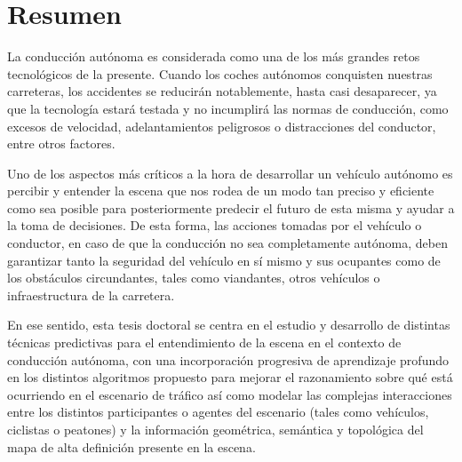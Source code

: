%
%
%
% 
%
%
%
%

\chapter*{Resumen}
\label{cha:resumen}


La conducción autónoma es considerada como una de los más grandes retos tecnológicos de la presente. Cuando los coches autónomos conquisten nuestras carreteras, los accidentes se reducirán notablemente, hasta casi desaparecer, ya que la tecnología estará testada y no incumplirá las normas de conducción, como excesos de velocidad, adelantamientos peligrosos o distracciones del conductor, entre otros factores.

Uno de los aspectos más críticos a la hora de desarrollar un vehículo autónomo es percibir y entender la escena que nos rodea de un modo tan preciso y eficiente como sea posible para posteriormente predecir el futuro de esta misma y ayudar a la toma de decisiones. De esta forma, las acciones tomadas por el vehículo o conductor, en caso de que la conducción no sea completamente autónoma, deben garantizar tanto la seguridad del vehículo en sí mismo y sus ocupantes como de los obstáculos circundantes, tales como viandantes, otros vehículos o infraestructura de la carretera.

En ese sentido, esta tesis doctoral se centra en el estudio y desarrollo de distintas técnicas predictivas para el entendimiento de la escena en el contexto de conducción autónoma, con una incorporación progresiva de aprendizaje profundo en los distintos algoritmos propuesto para mejorar el razonamiento sobre qué está ocurriendo en el escenario de tráfico así como modelar las complejas interacciones entre los distintos participantes o agentes del escenario (tales como vehículos, ciclistas o peatones) y la información geométrica, semántica y topológica del mapa de alta definición presente en la escena. 

